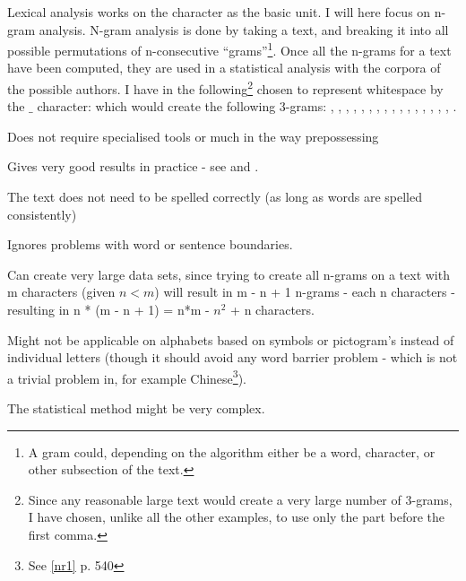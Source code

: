 {\label{character}
Lexical analysis works on the character as the basic unit. I will here focus on n-gram analysis. N-gram analysis is done by taking a text, and breaking it into all possible permutations of n-consecutive ``grams''\footnote{A gram could, depending on the algorithm either be a word, character, or other subsection of the text.}. Once all the n-grams for a text have been computed, they are used in a statistical analysis with the corpora of the possible authors. 
}
{
I have in the following\footnote{Since any reasonable large text would create a very large number of 3-grams, I have chosen, unlike all the other examples, to use only the part before the first comma.} chosen to represent whitespace by the $\_$ character:
which would create the following 3-grams: , , , , , , , , , , , , , , , , . 
}
{
\item Does not require specialised tools or much in the way prepossessing
\item Gives very good results in practice - see \cite{nr4} and \cite{nr3}.
\item The text does not need to be spelled correctly (as long as words are spelled consistently)
\item Ignores problems with word or sentence boundaries.
}
{
\item Can create very large data sets, since trying to create all n-grams on a text with m characters (given $n < m$) will result in m - n + 1 n-grams - each n characters - resulting in n * (m - n + 1) = n*m - $n^2$ + n characters.
\item Might not be applicable on alphabets based on symbols or pictogram's instead of individual letters (though it should avoid any word barrier problem - which is not a trivial problem in, for example Chinese\footnote{See \ref{nr1} p. 540}).
\item The statistical method might be very complex.
}

